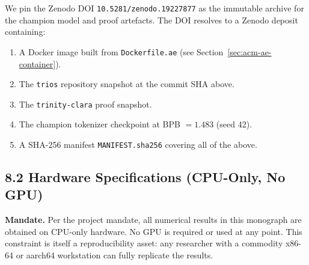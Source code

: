 We pin the Zenodo DOI \texttt{10.5281/zenodo.19227877} as the immutable
archive for the champion model and proof artefacts.  The DOI resolves to a
Zenodo deposit containing:

\begin{enumerate}
\item A Docker image built from \texttt{Dockerfile.ae} (see
  Section~\ref{sec:acm-ae-container}).
\item The \texttt{trios} repository snapshot at the commit SHA above.
\item The \texttt{trinity-clara} proof snapshot.
\item The champion tokenizer checkpoint at BPB $= 1.483$ (seed 42).
\item A SHA-256 manifest \texttt{MANIFEST.sha256} covering all of the
  above.
\end{enumerate}

\subsection{8.2 Hardware Specifications (CPU-Only, No GPU)}%
\label{sec:hw-specs}

\noindent\textbf{Mandate.}  Per the project mandate, all numerical results
in this monograph are obtained on CPU-only hardware.  No GPU is required or
used at any point.  This constraint is itself a reproducibility asset: any
researcher with a commodity x86-64 or aarch64 workstation can fully
replicate the results.

\begin{table}[h]
\caption{Reference hardware platform (CPU-only, no GPU)}
\label{tab:hw-specs}
\centering
{}
\end{table}

